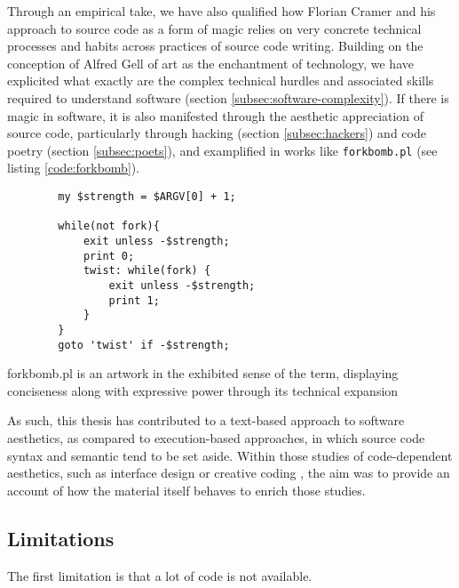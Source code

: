 Through an empirical take, we have also qualified how Florian Cramer and his approach to source code as a form of magic relies on very concrete technical processes and habits across practices of source code writing. Building on the conception of Alfred Gell of art as the enchantment of technology, we have explicited what exactly are the complex technical hurdles and associated skills required to understand software (section \ref{subsec:software-complexity}). If there is magic in software, it is also manifested through the aesthetic appreciation of source code, particularly through hacking (section \ref{subsec:hackers}) and code poetry (section \ref{subsec:poets}), and examplified in works like \lstinline{forkbomb.pl} (see listing \ref{code:forkbomb}).

\begin{listing}
    \begin{verbatim}
        my $strength = $ARGV[0] + 1;

        while(not fork){
            exit unless -$strength;
            print 0;
            twist: while(fork) {
                exit unless -$strength;
                print 1;
            }
        }
        goto 'twist' if -$strength;
    \end{verbatim}
    \caption[]{forkbomb.pl is an artwork in the exhibited sense of the term, displaying conciseness along with expressive power through its technical expansion}
    \label{code:forkbomb}
\end{listing}

As such, this thesis has contributed to a text-based approach to software aesthetics, as compared to execution-based approaches, in which source code syntax and semantic tend to be set aside. Within those studies of code-dependent aesthetics, such as interface design \citep{fishwick_aesthetic_2001} or creative coding \citep{cox_aesthetic_2020}, the aim was to provide an account of how the material itself behaves to enrich those studies.



\subsection{Limitations} %

The first limitation is that a lot of code is not available.

